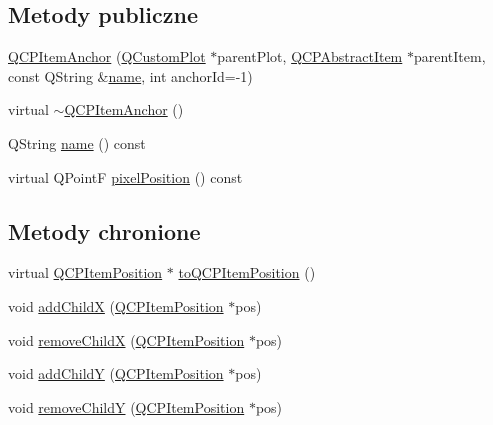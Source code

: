 \subsection*{Metody publiczne}
\begin{DoxyCompactItemize}
\item 
\hyperlink{class_q_c_p_item_anchor_a32573023c6fa65b4496f1f995e5bfa5f}{Q\+C\+P\+Item\+Anchor} (\hyperlink{class_q_custom_plot}{Q\+Custom\+Plot} $\ast$parent\+Plot, \hyperlink{class_q_c_p_abstract_item}{Q\+C\+P\+Abstract\+Item} $\ast$parent\+Item, const Q\+String \&\hyperlink{class_q_c_p_item_anchor_ac93984042a58c875e76847dc3e5f75fe}{name}, int anchor\+Id=-\/1)
\item 
virtual \hyperlink{class_q_c_p_item_anchor_a1868559407600688ee4d1a4621e81ceb}{$\sim$\+Q\+C\+P\+Item\+Anchor} ()
\item 
Q\+String \hyperlink{class_q_c_p_item_anchor_ac93984042a58c875e76847dc3e5f75fe}{name} () const 
\item 
virtual Q\+PointF \hyperlink{class_q_c_p_item_anchor_a4e7e1764fcba37b532e833cb30fee4ee}{pixel\+Position} () const 
\end{DoxyCompactItemize}
\subsection*{Metody chronione}
\begin{DoxyCompactItemize}
\item 
virtual \hyperlink{class_q_c_p_item_position}{Q\+C\+P\+Item\+Position} $\ast$ \hyperlink{class_q_c_p_item_anchor_ac54b20120669950255a63587193dbb86}{to\+Q\+C\+P\+Item\+Position} ()
\item 
void \hyperlink{class_q_c_p_item_anchor_aef15daa640debfb11b0aeaa2116c6fbc}{add\+ChildX} (\hyperlink{class_q_c_p_item_position}{Q\+C\+P\+Item\+Position} $\ast$pos)
\item 
void \hyperlink{class_q_c_p_item_anchor_a230b1d494cda63458e289bbe1b642599}{remove\+ChildX} (\hyperlink{class_q_c_p_item_position}{Q\+C\+P\+Item\+Position} $\ast$pos)
\item 
void \hyperlink{class_q_c_p_item_anchor_af05dc56f24536f0c7a9a0f57b58cea67}{add\+ChildY} (\hyperlink{class_q_c_p_item_position}{Q\+C\+P\+Item\+Position} $\ast$pos)
\item 
void \hyperlink{class_q_c_p_item_anchor_aa2394911d8fff3bd958b9f4f1994b64d}{remove\+ChildY} (\hyperlink{class_q_c_p_item_position}{Q\+C\+P\+Item\+Position} $\ast$pos)
\end{DoxyCompactItemize}
